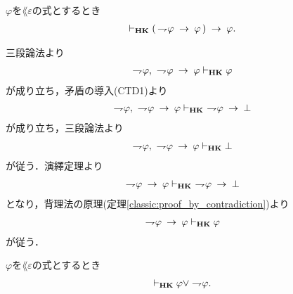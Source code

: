 	\begin{screen}
		\begin{thm}[驚嘆すべき帰結]\label{classic:consequentia_mirabilis}
			$\varphi$を$\lang{\varepsilon}$の式とするとき
			\begin{align}
				\provable{\mbox{{\bf HK}}} 
				(\, \negation \varphi \rarrow \varphi\, ) \rarrow \varphi.
			\end{align}
		\end{thm}
	\end{screen}
	
	\begin{sketch}
		三段論法より
		\begin{align}
			\negation \varphi,\ \negation \varphi \rarrow \varphi
			\provable{\mbox{{\bf HK}}} \varphi
		\end{align}
		が成り立ち，矛盾の導入(CTD1)より
		\begin{align}
			\negation \varphi,\ \negation \varphi \rarrow \varphi
			\provable{\mbox{{\bf HK}}}\ \negation \varphi \rarrow \bot
		\end{align}
		が成り立ち，三段論法より
		\begin{align}
			\negation \varphi,\ \negation \varphi \rarrow \varphi
			\provable{\mbox{{\bf HK}}} \bot
		\end{align}
		が従う．演繹定理より
		\begin{align}
			\negation \varphi \rarrow \varphi
			\provable{\mbox{{\bf HK}}}\ \negation \varphi \rarrow \bot
		\end{align}
		となり，背理法の原理(定理\ref{classic:proof_by_contradiction})より
		\begin{align}
			\negation \varphi \rarrow \varphi
			\provable{\mbox{{\bf HK}}} \varphi
		\end{align}
		が従う．
		\QED
	\end{sketch}
	
	\begin{screen}
		\begin{thm}[排中律]\label{classic:law_of_excluded_middle}
			$\varphi$を$\lang{\varepsilon}$の式とするとき
			\begin{align}
				\provable{\mbox{{\bf HK}}} \varphi \vee \negation \varphi.
			\end{align}
		\end{thm}
	\end{screen}
	
